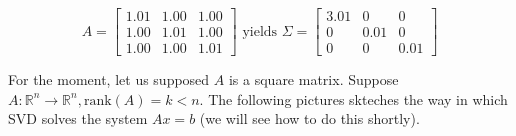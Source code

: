 \[
    A = \begin{bmatrix}
        1.01 & 1.00 & 1.00 \\
        1.00 & 1.01 & 1.00 \\
        1.00 & 1.00 & 1.01
    \end{bmatrix}
    \text{ yields }
    \Sigma = \begin{bmatrix}
        3.01 & 0 & 0 \\
        0 & 0.01 & 0 \\
        0 & 0 & 0.01
    \end{bmatrix}
\]

For the moment, let us supposed $A$ is a square matrix. Suppose $A: \mathbb{R}^n \rightarrow \mathbb{R}^n, \text{rank}(A) = k < n$. The following pictures skteches the way in which SVD solves the system $Ax=b$ (we will see how to do this shortly). 


